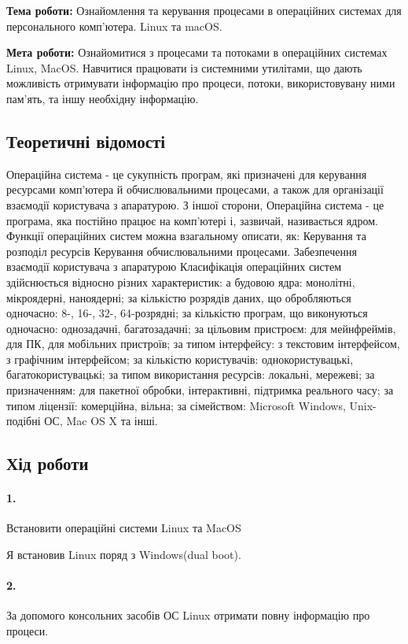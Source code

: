 \documentclass[12pt]{extarticle}
\begin{document}
\textbf{Тема роботи:} Ознайомлення та керування процесами в операційних системах для
персонального комп’ютера. Linux та macOS.
\vspace{12pt}

\textbf{Мета роботи:} Ознайомитися з процесами та потоками в операційних системах
Linux, MacOS. Навчитися працювати із системними утилітами, що дають
можливість отримувати інформацію про процеси, потоки, використовувану
ними пам'ять, та іншу необхідну інформацію.

\subsection*{Теоретичні відомості}
Операційна система - це сукупність програм, які призначені для
керування ресурсами комп'ютера й обчислювальними процесами, а також для
організації взаємодії користувача з апаратурою. З іншої сторони, Операційна
система - це програма, яка постійно працює на комп'ютері і, зазвичай,
називається ядром.
Функції операційних систем можна взагальному описати, як:
Керування та розподіл ресурсів
Керування обчислювальними процесами.
Забезпечення взаємодії користувача з апаратурою
Класифікація операційних систем здійснюється відносно різних
характеристик:
а будовою ядра: монолітні, мікроядерні, наноядерні;
за кількістю розрядів даних, що обробляються одночасно: 8-, 16-,
32-, 64-розрядні;
за кількістю програм, що виконуються одночасно: однозадачні,
багатозадачні;
за цільовим пристроєм: для мейнфреймів, для ПК, для мобільних
пристроїв;
за типом інтерфейсу: з текстовим інтерфейсом, з графічним
інтерфейсом;
за кількістю користувачів: однокористувацькі, багатокористувацькі;
за типом використання ресурсів: локальні, мережеві;
за призначенням: для пакетної обробки, інтерактивні, підтримка
реального часу;
за типом ліцензії: комерційна, вільна;
за сімейством: Microsoft Windows, Unix-подібні ОС, Mac OS X
та інші.

\subsection*{Хід роботи}


\paragraph{1.}
Встановити операційні системи Linux та MacOS

\vspace{12pt}
Я встановив Linux поряд з Windows(dual boot).
\paragraph{2.}
За допомого консольних засобів ОС Linux отримати повну інформацію
про процеси.
\end{document}
